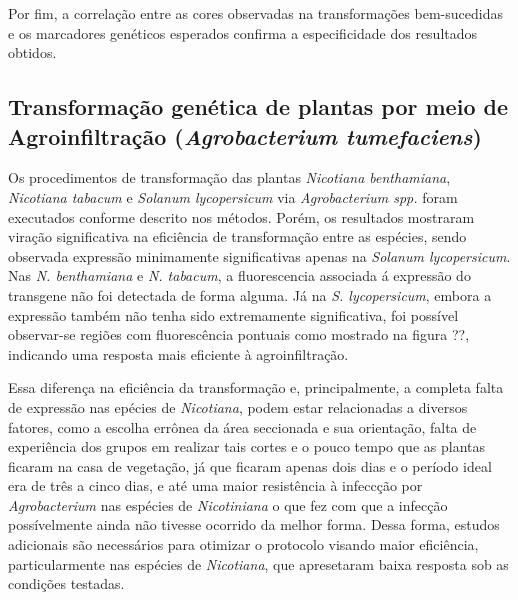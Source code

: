 Por fim, a correlação entre as cores observadas na transformações bem-sucedidas
e os marcadores genéticos esperados confirma a especificidade dos resultados
obtidos.

\subsection{Transformação genética de plantas por meio de Agroinfiltração (\textit{Agrobacterium tumefaciens})}
Os procedimentos de transformação das plantas \textit{Nicotiana benthamiana}, \textit{Nicotiana tabacum} e \textit{Solanum lycopersicum} via \textit{Agrobacterium spp.} foram executados conforme descrito nos métodos. Porém, os resultados mostraram viração significativa na eficiência de transformação entre as espécies, sendo observada expressão minimamente significativas apenas na \textit{Solanum lycopersicum}.
Nas \textit{N. benthamiana} e \textit{N. tabacum}, a fluorescencia associada á expressão do transgene não foi detectada de forma alguma. Já na \textit{S. lycopersicum}, embora a expressão também não tenha sido extremamente significativa, foi possível observar-se regiões com fluorescência pontuais como mostrado na figura ??, indicando uma resposta mais eficiente à agroinfiltração.

Essa diferença na eficiência da transformação e, principalmente, a completa falta de expressão nas epécies de \textit{Nicotiana}, podem estar relacionadas a diversos fatores, como a escolha errônea da área seccionada e sua orientação, falta de experiência dos grupos em realizar tais cortes e o pouco tempo que as plantas ficaram na casa de vegetação, já que ficaram apenas dois dias e o período ideal era de três a cinco dias, e até uma maior resistência à infeccção por \textit{Agrobacterium} nas espécies de \textit{Nicotiniana} o que fez com que a infecção possívelmente ainda não tivesse ocorrido da melhor forma. Dessa forma, estudos adicionais são necessários para otimizar o protocolo visando maior eficiência, particularmente nas espécies de \textit{Nicotiana}, que apresetaram baixa resposta sob as condições testadas. 
